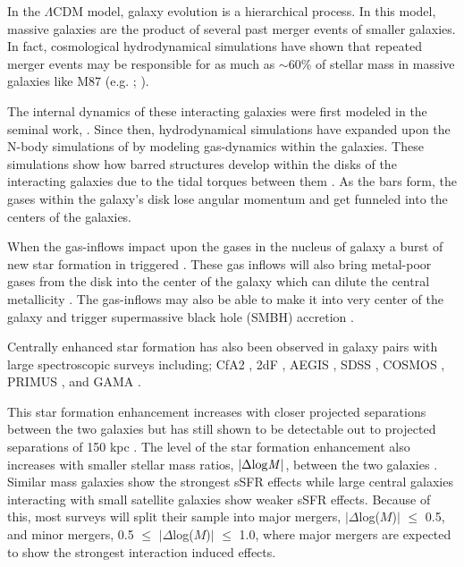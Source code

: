 \documentclass[iop,revtex4,twocolumn,apj,numberedappendix,appendixfloats]{emulateapj}
\begin{document}
In the $\Lambda$CDM model, galaxy evolution is a hierarchical process. In this model, massive galaxies are the product of several past merger events of smaller galaxies. In fact, cosmological hydrodynamical simulations have shown that repeated merger events may be responsible for as much as $\sim$60\% of stellar mass in massive galaxies like M87 (e.g. \citet{Rodriguez-Gomez:2016}; \citet{Pillepich:2018}). 

The internal dynamics of these interacting galaxies were first modeled in the seminal work, \citet{Toomre:1972}. Since then, hydrodynamical simulations have expanded upon the N-body simulations of \citet{Toomre:1972} by modeling gas-dynamics within the galaxies. These simulations show how barred structures develop within the disks of the interacting galaxies due to the tidal torques between them \citep{Barnes:1991}. As the bars form, the gases within the galaxy's disk lose angular momentum and get funneled into the centers of the galaxies. 

When the gas-inflows impact upon the gases in the nucleus of galaxy a burst of new star formation in triggered \citep{Barnes:1996, Mihos:1996}. These gas inflows will also bring metal-poor gases from the disk into the center of the galaxy which can dilute the central metallicity \citep{Rupke:2010, Perez:2011, Scudder:2012}. The gas-inflows may also be able to make it into very center of the galaxy and trigger supermassive black hole (SMBH) accretion \citep{Capelo:2017}. 

Centrally enhanced star formation has also been observed in galaxy pairs with large spectroscopic surveys including; CfA2  \citep{Barton:2000, Woods:2006}, 2dF \citep{Lambas:2003}, AEGIS \citep{Lin:2007}, SDSS \citep{Ellison:2008}, COSMOS \citep{Kartaltepe:2007,Xu:2012}, PRIMUS \citep{Wong:2011}, and GAMA \citep{Robotham:2014}.

This star formation enhancement increases with closer projected separations between the two galaxies \citep{Ellison:2008, Scudder:2012} but has still shown to be detectable out to projected separations of 150 kpc \citep{Patton:2013}. The level of the star formation enhancement also increases with smaller stellar mass ratios, $|\Delta {\rm log} {\it M} |$, between the two galaxies \citep{Ellison:2008}. Similar mass galaxies show the strongest sSFR effects while large central galaxies interacting with small satellite galaxies show weaker sSFR effects. Because of this, most surveys will split their sample into major mergers, $|\Delta$log($M$)$|$ $\le$ 0.5, and minor mergers, 0.5 $\le$ $|\Delta$log($M$)$|$ $\le$ 1.0, where major mergers are expected to show the strongest interaction induced effects. 
\end{document}
